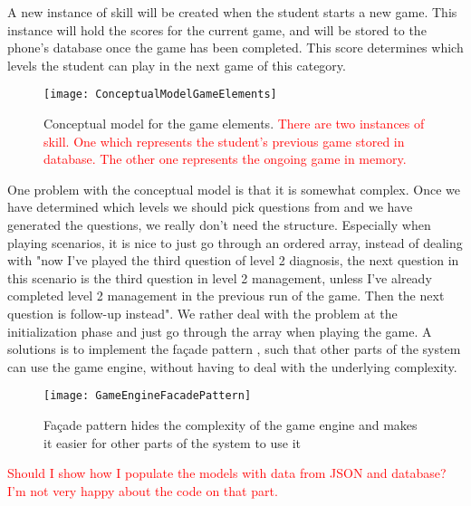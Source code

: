 A new instance of skill will be created when the student starts a new game. This instance will hold the scores for the current game, and will be stored to the phone's database once the game has been completed. This score determines which levels the student can play in the next game of this category.


\begin{figure}[h!]
	\texttt{[image: ConceptualModelGameElements]}
	\caption {Conceptual model for the game elements. \textcolor{red}{There are two instances of skill. One which represents the student's previous game stored in database. The other one represents the ongoing game in memory.}}
	\label{fig:ConceptualGameElements}
\end{figure}

One problem with the conceptual model is that it is somewhat complex. Once we have determined which levels we should pick questions from and we have generated the questions, we really don't need the structure. Especially when playing scenarios, it is nice to just go through an ordered array, instead of dealing with "now I've played the third question of level 2 diagnosis, the next question in this scenario is the third question in level 2 management, unless I've already completed level 2 management in the previous run of the game. Then the next question is follow-up instead". We rather deal with the problem at the initialization phase and just go through the array when playing the game. A solutions is to implement the façade pattern \parencite{Gamma1994}, such that other parts of the system can use the game engine, without having to deal with the underlying complexity. 


\begin{figure}[h!]
	\texttt{[image: GameEngineFacadePattern]}
	\caption {Façade pattern hides the complexity of the game engine and makes it easier for other parts of the system to use it}
	\label{fig:GameEngineFacadePattern}
\end{figure}

\textcolor{red}{Should I show how I populate the models with data from JSON and database? I'm not very happy about the code on that part.}





